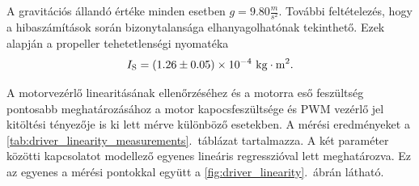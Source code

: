 A gravitációs állandó értéke minden esetben \(g = 9.80 \frac{m}{s^2}\). További feltételezés, hogy a 
hibaszámítások során bizonytalansága elhanyagolhatónak tekinthető. Ezek alapján a propeller 
tehetetlenségi nyomatéka
\begin{equation}
    I_{\mathrm{S}} = (1.26 \pm 0.05)\times10^{-4}~\mathrm{kg \cdot m^2}.
\end{equation}

A motorvezérlő linearitásának ellenőrzéséhez és a motorra eső feszültség pontosabb meghatározásához 
a motor kapocsfeszültsége és PWM vezérlő jel kitöltési tényezője is ki lett mérve különböző esetekben.
A mérési eredményeket a \ref{tab:driver_linearity_measurements}.~táblázat tartalmazza. A két paraméter közötti kapcsolatot modellező 
egyenes lineáris regresszióval lett meghatározva. Ez az egyenes a mérési pontokkal együtt a \ref{fig:driver_linearity}.~ábrán látható.

